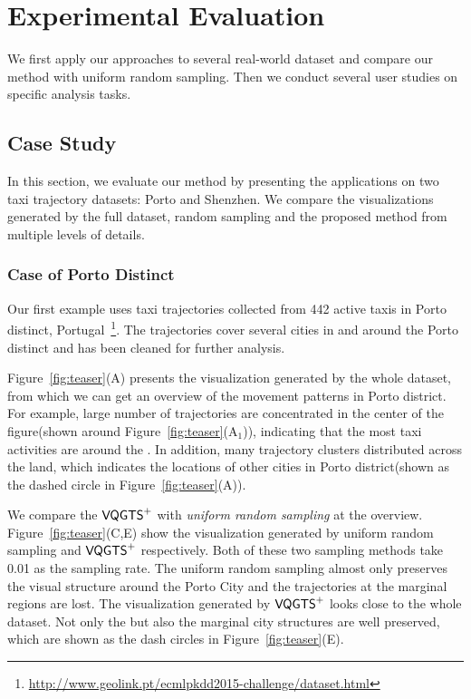 \section{Experimental Evaluation}\label{sec:exp}
We first apply our approaches to several real-world dataset and compare our method with uniform random sampling. Then we conduct several user studies on specific analysis tasks. 
\subsection{Case Study}
In this section, we evaluate our method by presenting the applications on two taxi trajectory datasets: Porto and Shenzhen. We compare the visualizations generated by the full dataset, random sampling and the proposed method from multiple levels of details. 
\subsubsection{Case of Porto Distinct}
Our first example uses taxi trajectories collected from 442 active taxis in Porto distinct, Portugal~\footnote{\url{http://www.geolink.pt/ecmlpkdd2015-challenge/dataset.html}}. The trajectories cover several cities in and around the Porto distinct and has been cleaned for further analysis.


Figure~\ref{fig:teaser}(A) presents the visualization generated by the whole dataset, from which we can get an overview of the movement patterns in Porto district. For example, large number of trajectories are concentrated in the center of the figure(shown around Figure~\ref{fig:teaser}(A$_1$)), indicating that the most taxi activities are around the . In addition, 
many trajectory clusters distributed across the land, which indicates the locations of other cities in Porto district(shown as the dashed circle in Figure~\ref{fig:teaser}(A)). 

We compare the $\mathsf{VQGTS}^{+}$ with \textit{uniform random sampling} at the overview. 
Figure~\ref{fig:teaser}(C,E) show the visualization generated by uniform random sampling and $\mathsf{VQGTS}^{+}$ respectively. Both of these two sampling methods take 0.01 as the sampling rate. The uniform random sampling almost only preserves the visual structure around the Porto City and the trajectories at the marginal regions are lost.
The visualization generated by $\mathsf{VQGTS}^{+}$ looks close to the whole dataset. Not only the  but also the marginal city structures are well preserved, which are shown as the dash circles in Figure~\ref{fig:teaser}(E).
 
